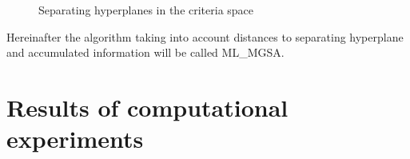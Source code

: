 \documentclass[runningheads]{llncs}
\begin{document}
\begin{figure}[ht]
\center
\begin{minipage}{0.45\linewidth}
\end{minipage}
\begin{minipage}{0.45\linewidth}
\end{minipage}

\caption{Separating hyperplanes in the criteria space} \label{fig:1}
\end{figure}

Hereinafter the algorithm taking into account distances to separating hyperplane and accumulated information will be called ML\_MGSA.

\section{Results of computational experiments}
\end{document}
